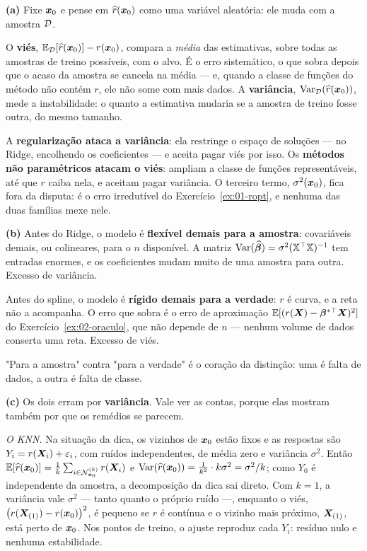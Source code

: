 \begin{solucao}
\textbf{(a)} Fixe $\bm{x}_0$ e pense em $\widehat{r}(\bm{x}_0)$ como uma variável aleatória: ele muda
com a amostra $\mathcal{D}$.

O \textbf{viés}, $\mathbb{E}_{\mathcal{D}}[\widehat{r}(\bm{x}_0)]-r(\bm{x}_0)$, compara a \emph{média} das
estimativas, sobre todas as amostras de treino possíveis, com o alvo. É o erro
sistemático, o que sobra depois que o acaso da amostra se cancela na média --- e,
quando a classe de funções do método não contém $r$, ele não some com mais dados. A
\textbf{variância}, $\operatorname{Var}_{\mathcal{D}}(\widehat{r}(\bm{x}_0))$, mede a instabilidade: o quanto a
estimativa mudaria se a amostra de treino fosse outra, do mesmo tamanho.

A \textbf{regularização ataca a variância}: ela restringe o espaço de soluções --- no
Ridge, encolhendo os coeficientes --- e aceita pagar viés por isso. Os \textbf{métodos
não paramétricos atacam o viés}: ampliam a classe de funções representáveis, até que
$r$ caiba nela, e aceitam pagar variância. O terceiro termo, $\sigma^2(\bm{x}_0)$, fica
fora da disputa: é o erro irredutível do Exercício~\ref{ex:01-ropt}, e nenhuma das
duas famílias mexe nele.

\smallskip
\textbf{(b)} Antes do Ridge, o modelo é \textbf{flexível demais para a amostra}:
covariáveis demais, ou colineares, para o $n$ disponível. A matriz
$\operatorname{Var}(\widehat{\bm{\beta}})=\sigma^2(\mathbb{X}^\top\mathbb{X})^{-1}$ tem entradas enormes, e
os coeficientes mudam muito de uma amostra para outra. Excesso de variância.

Antes do spline, o modelo é \textbf{rígido demais para a verdade}: $r$ é curva, e a
reta não a acompanha. O erro que sobra é o erro de aproximação
$\mathbb{E}[(r(\bm{X})-\bm{\beta}^{\ast\top}\bm{X})^2]$ do Exercício~\ref{ex:02-oraculo}, que não depende de
$n$ --- nenhum volume de dados conserta uma reta. Excesso de viés.

"Para a amostra" contra "para a verdade" é o coração da distinção: uma é falta de
dados, a outra é falta de classe.

\smallskip
\textbf{(c)} Os dois erram por \textbf{variância}. Vale ver as contas, porque elas
mostram também por que os remédios se parecem.

\emph{O KNN.} Na situação da dica, os vizinhos de $\bm{x}_0$ estão fixos e as respostas são
$Y_i=r(\bm{X}_i)+\varepsilon_i$, com ruídos independentes, de média zero e variância
$\sigma^2$. Então $\mathbb{E}[\widehat{r}(\bm{x}_0)]=\frac1k\sum_{i\in\mathcal{N}_{\bm{x}_0}^{(k)}}r(\bm{X}_i)$ e
$\operatorname{Var}(\widehat{r}(\bm{x}_0))=\frac1{k^2}\cdot k\sigma^2=\sigma^2/k$; como $Y_0$ é independente da
amostra, a decomposição da dica sai direto. Com $k=1$, a variância vale $\sigma^2$ ---
tanto quanto o próprio ruído ---, enquanto o viés,
$\big(r(\bm{X}_{(1)})-r(\bm{x}_0)\big)^2$, é pequeno se $r$ é contínua e o vizinho mais próximo,
$\bm{X}_{(1)}$, está perto de $\bm{x}_0$. Nos pontos de treino, o ajuste reproduz cada $Y_i$:
resíduo nulo e nenhuma estabilidade.


\end{solucao}
